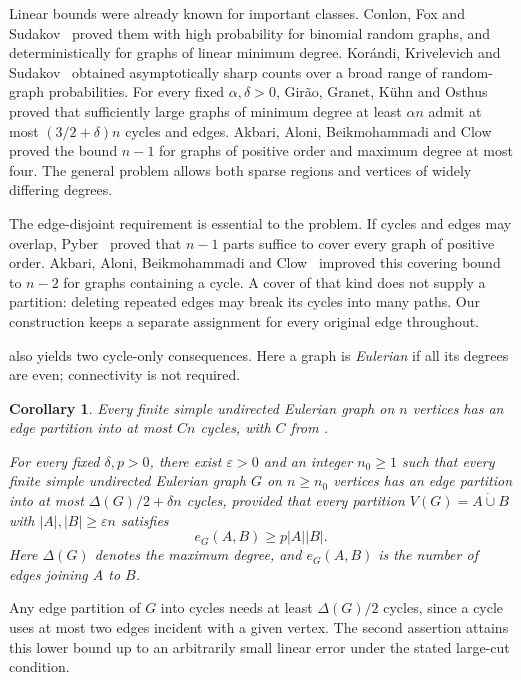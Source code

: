 \documentclass[11pt]{article}
\numberwithin{equation}{section}
\newtheorem{corollary}[theorem]{Corollary}
\theoremstyle{definition}
\theoremstyle{remark}
\newcommand{\eps}{\varepsilon}
\begin{document}
Linear bounds were already known for important classes. Conlon, Fox
and Sudakov~\cite[Theorems~1.3 and~1.4]{CFS2014} proved them with high
probability for binomial random graphs, and deterministically for
graphs of linear minimum degree.
Kor\'andi, Krivelevich and Sudakov~\cite{KKS2015} obtained
asymptotically sharp counts over a broad range of random-graph
probabilities. For every fixed \(\alpha,\delta>0\), Gir\~ao,
Granet, K\"uhn and Osthus~\cite[Theorem~1.10(iii)]{GGKO2021}
proved that sufficiently large graphs of minimum degree at least
\(\alpha n\) admit at most \((3/2+\delta)n\) cycles and edges.
Akbari, Aloni, Beikmohammadi and Clow~\cite[Theorem~1.3]{AABC2025}
proved the bound \(n-1\) for graphs of positive order and maximum
degree at most four.
The general problem allows both sparse regions and vertices of
widely differing degrees.

The edge-disjoint requirement is essential to the problem. If cycles
and edges may overlap, Pyber~\cite{Pyber1985} proved that \(n-1\)
parts suffice to cover every graph of positive order. Akbari, Aloni,
Beikmohammadi and Clow~\cite[Theorem~1.7]{AABC2025} improved this
covering bound to \(n-2\) for graphs containing a cycle.
A cover of that kind does not supply a partition: deleting repeated
edges may break its cycles into many paths. Our construction keeps a
separate assignment for every original edge throughout.

 also yields two cycle-only consequences. Here a graph is
\emph{Eulerian} if all its degrees are even; connectivity is not required.

\begin{corollary}\label{cor:eulerian-cycles}
Every finite simple undirected Eulerian graph on \(n\) vertices has an
edge partition into at most \(Cn\) cycles, with \(C\) from .

For every fixed \(\delta,p>0\), there exist \(\eps>0\) and an integer
\(n_0\ge1\) such that every finite simple undirected Eulerian graph \(G\)
on \(n\ge n_0\) vertices has an edge partition into at most
\(\Delta(G)/2+\delta n\) cycles, provided that every partition
\(V(G)=A\mathbin{\dot\cup}B\) with \(|A|,|B|\ge\eps n\) satisfies
\[
 e_G(A,B)\ge p|A||B|.
\]
Here \(\Delta(G)\) denotes the maximum degree, and \(e_G(A,B)\)
is the number of edges joining \(A\) to \(B\).
\end{corollary}

Any edge partition of \(G\) into cycles needs at least \(\Delta(G)/2\)
cycles, since a cycle uses at most two edges incident with a given
vertex. The second assertion attains this lower bound up to an
arbitrarily small linear error under the stated large-cut condition.
\end{document}
